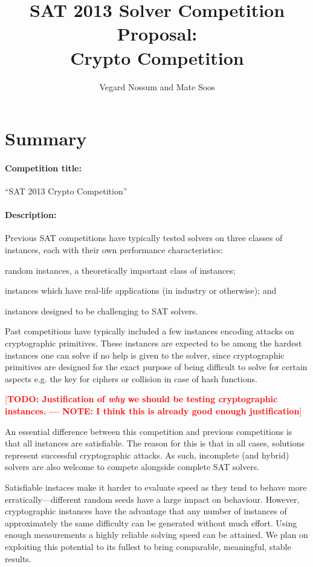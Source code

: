 \documentclass[12pt, a4paper]{article}
\title{SAT 2013 Solver Competition Proposal: \\ Crypto Competition}
\author{Vegard Nossum and Mate Soos}
\newcommand{\XXX}[1]{\textcolor{red}{[\textbf{#1}]}}
\begin{document}
\maketitle


\section{Summary}

\paragraph{Competition title:} “SAT 2013 Crypto Competition”

\paragraph{Description:}
Previous SAT competitions have typically tested solvers on three classes of instances, each with their own performance characteristics:
\begin{inparaenum}
\item random instances, a theoretically important class of instances;
\item instances which have real-life applications (in industry or otherwise); and
\item instances designed to be challenging to SAT solvers.
\end{inparaenum}

Past competitions have typically included a few instances encoding attacks on cryptographic primitives. These instances are expected to be among the hardest instances one can solve if no help is given to the solver, since cryptographic primitives are designed for the exact purpose of being difficult to solve for certain aspects e.g. the key for ciphers or collision in case of hash functions.

\XXX{TODO: Justification of \emph{why} we should be testing cryptographic instances. --- NOTE: I think this is already good enough justification}

An essential difference between this competition and previous competitions is that all instances are satisfiable. The reason for this is that in all cases, solutions represent successful cryptographic attacks. As such, incomplete (and hybrid) solvers are also welcome to compete alongside complete SAT solvers.

Satisfiable instaces make it harder to evaluate speed as they tend to behave more erratically---different random seeds have a large impact on behaviour. However, cryptographic instances have the advantage that any number of instances of approximately the same difficulty can be generated without much effort. Using enough measurements a highly reliable solving speed can be attained. We plan on exploiting this potential to its fullest to bring comparable, meaningful, stable results.
\end{document}
